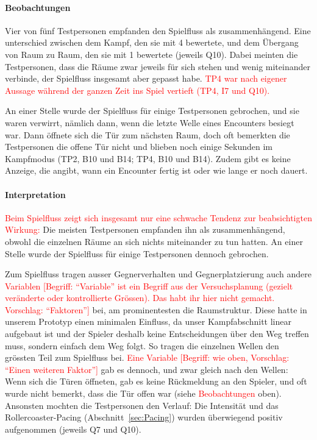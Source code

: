 \documentclass[../Main.tex]{subfiles}
\begin{document}
\paragraph{Beobachtungen}
Vier von fünf Testpersonen empfanden den Spielfluss als zusammenhängend. Eine unterschied zwischen dem Kampf, den sie mit 4 bewertete, und dem Übergang von Raum zu Raum, den sie mit 1 bewertete (jeweils Q10). Dabei meinten die Testpersonen, dass die Räume zwar jeweils für sich stehen und wenig miteinander verbinde, der Spielfluss insgesamt aber gepasst habe. \textcolor{red}{TP4 war nach eigener Aussage während der ganzen Zeit ins Spiel vertieft (TP4, I7 und Q10).}

An einer Stelle wurde der Spielfluss für einige Testpersonen gebrochen, und sie waren verwirrt, nämlich dann, wenn die letzte Welle eines Encounters besiegt war. Dann öffnete sich die Tür zum nächsten Raum, doch oft bemerkten die Testpersonen die offene Tür nicht und blieben noch einige Sekunden im Kampfmodus (TP2, B10 und B14; TP4, B10 und B14). Zudem gibt es keine Anzeige, die angibt, wann ein Encounter fertig ist oder wie lange er noch dauert.

\paragraph{Interpretation}
\textcolor{red}{Beim Spielfluss zeigt sich insgesamt nur eine schwache Tendenz zur beabsichtigten Wirkung:} Die meisten Testpersonen empfanden ihn als zusammenhängend, obwohl die einzelnen Räume an sich nichts miteinander zu tun hatten. An einer Stelle wurde der Spielfluss für einige Testpersonen dennoch gebrochen.

Zum Spielfluss tragen ausser Gegnerverhalten und Gegnerplatzierung auch andere \textcolor{red}{Variablen [Begriff: \enquote{Variable} ist ein Begriff aus der Versuchsplanung (gezielt veränderte oder kontrollierte Grössen). Das habt ihr hier nicht gemacht. Vorschlag: \enquote{Faktoren}]} bei, am prominentesten die Raumstruktur. Diese hatte in unserem Prototyp einen minimalen Einfluss, da unser Kampfabschnitt linear aufgebaut ist und der Spieler deshalb keine Entscheidungen über den Weg treffen muss, sondern einfach dem Weg folgt. So tragen die einzelnen Wellen den grössten Teil zum Spielfluss bei. \textcolor{red}{Eine Variable [Begriff: wie oben, Vorschlag: \enquote{Einen weiteren Faktor}]} gab es dennoch, und zwar gleich nach den Wellen: Wenn sich die Türen öffneten, gab es keine Rückmeldung an den Spieler, und oft wurde nicht bemerkt, dass die Tür offen war (siehe \textcolor{red}{Beobachtungen} oben). Ansonsten mochten die Testpersonen den Verlauf: Die Intensität und das Rollercoaster-Pacing (Abschnitt~\ref{sec:Pacing}) wurden überwiegend positiv aufgenommen (jeweils Q7 und Q10).
\end{document}
